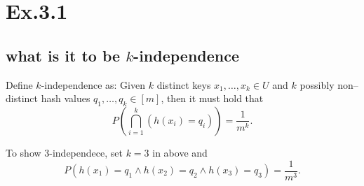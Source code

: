 \section*{Ex.3.1}
\subsection*{what is it to be $k$-independence}
Define $k$-independence as: Given $k$ distinct keys $x_1,\ldots,x_k\in{U}$ and $k$ possibly non--distinct hash values $q_1,\ldots,q_k\in[m]$, then it must hold that 
$$
P(\bigcap_{i=1}^k (h(x_i)=q_i)) = \frac{1}{m^k}.
$$

To show 3-independece, set $k=3$ in above and 
$$
P(h(x_1)=q_1 \land h(x_2)=q_2 \land h(x_3)=q_3) = \frac{1}{m^3}.
$$